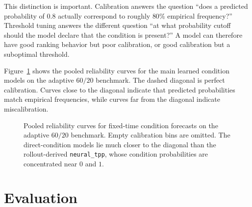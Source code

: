 \documentclass[11pt]{article}
\begin{document}
This distinction is important. Calibration answers the question ``does a predicted probability of \(0.8\) actually correspond to roughly \(80\%\) empirical frequency?'' Threshold tuning answers the different question ``at what probability cutoff should the model declare that the condition is present?'' A model can therefore have good ranking behavior but poor calibration, or good calibration but a suboptimal threshold.

Figure~\ref{fig:calibration} shows the pooled reliability curves for the main learned condition models on the adaptive \(60/20\) benchmark. The dashed diagonal is perfect calibration. Curves close to the diagonal indicate that predicted probabilities match empirical frequencies, while curves far from the diagonal indicate miscalibration.

\begin{figure}[H]
\centering
{}
\caption{Pooled reliability curves for fixed-time condition forecasts on the adaptive \(60/20\) benchmark. Empty calibration bins are omitted. The direct-condition models lie much closer to the diagonal than the rollout-derived \texttt{neural\_tpp}, whose condition probabilities are concentrated near \(0\) and \(1\).}
\label{fig:calibration}
\end{figure}

\section{Evaluation}
\end{document}
